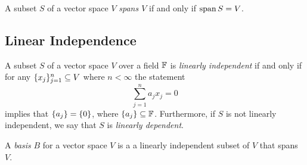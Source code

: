 \begin{definition}[Span]
A subset $S$ of a vector space $V$ \textit{spans $V$} if and only if $\operatorname{span} S=V$.
\end{definition}

\pagebreak

\subsection{Linear Independence}

\begin{definition}
	A subset $S$ of a vector space $V$ over a field $\mathbb{F}$ is \textit{linearly independent} if and only if for any $\lbrace x_j \rbrace_{j=1}^n\subseteq V$ where $n<\infty$ the statement
	\[
		\sum_{j=1}^n a_jx_j=0
	\]
	implies that $\lbrace a_j \rbrace=\lbrace 0 \rbrace$, where $\lbrace a_j \rbrace\subseteq\mathbb{F}$.
	Furthermore, if $S$ is not linearly independent, we say that $S$ is \textit{linearly dependent}.
\end{definition}

\begin{definition}
	A \textit{basis} $B$ for a vector space $V$ is a a linearly independent subset of $V$ that spans $V$.
\end{definition}
